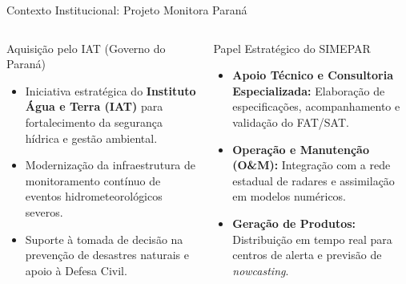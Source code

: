 ﻿\documentclass[aspectratio=169]{beamer}
\begin{document}
\begin{frame}{Contexto Institucional: Projeto Monitora Paran{\'a}}
    \begin{columns}[T]
        \begin{column}{0.48\textwidth}
            \begin{block}{Aquisi{\c{c}}{\~a}o pelo IAT (Governo do Paran{\'a})}
                \begin{itemize}
                    \item Iniciativa estrat{\'e}gica do \textbf{Instituto {\'A}gua e Terra (IAT)} para fortalecimento da seguran{\c{c}}a h{\'i}drica e gest{\~a}o ambiental.
                    \item Moderniza{\c{c}}{\~a}o da infraestrutura de monitoramento cont{\'i}nuo de eventos hidrometeorol{\'o}gicos severos.
                    \item Suporte {\`a} tomada de decis{\~a}o na preven{\c{c}}{\~a}o de desastres naturais e apoio {\`a} Defesa Civil.
                \end{itemize}
            \end{block}
        \end{column}

        \begin{column}{0.48\textwidth}
            \begin{exampleblock}{Papel Estrat{\'e}gico do SIMEPAR}
                \begin{itemize}
                    \item \textbf{Apoio T{\'e}cnico e Consultoria Especializada:} Elabora{\c{c}}{\~a}o de especifica{\c{c}}{\~o}es, acompanhamento e valida{\c{c}}{\~a}o do FAT/SAT.
                    \item \textbf{Opera{\c{c}}{\~a}o e Manuten{\c{c}}{\~a}o (O\&M):} Integra{\c{c}}{\~a}o com a rede estadual de radares e assimila{\c{c}}{\~a}o em modelos num{\'e}ricos.
                    \item \textbf{Gera{\c{c}}{\~a}o de Produtos:} Distribui{\c{c}}{\~a}o em tempo real para centros de alerta e previs{\~a}o de \textit{nowcasting}.
                \end{itemize}
            \end{exampleblock}
        \end{column}
    \end{columns}
\end{frame}
\end{document}
